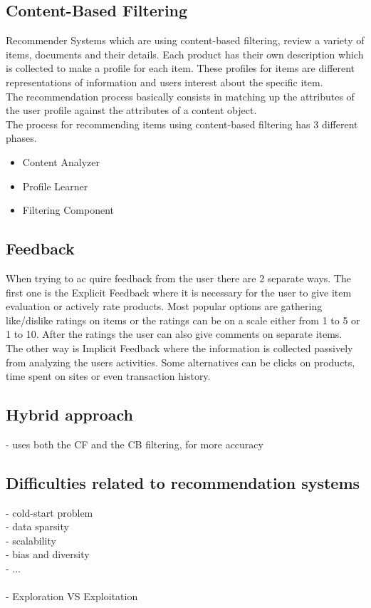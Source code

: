 \documentclass[10pt,oneside,english,a4paper]{article}
\begin{document}
\subsection{Content-Based Filtering}
Recommender Systems which are using content-based filtering, review a variety of items, documents and their details. Each product has their own description which is collected to make a profile for each item. These profiles for items are different representations of information and users interest about the specific item. \\
The recommendation process basically consists in matching
up the attributes of the user profile against the attributes of a content object.
\cite{pub.1034486657}\\
The process for recommending items using content-based filtering has 3 different phases.
\begin{itemize}
\item Content Analyzer
\item Profile Learner
\item Filtering Component
\end{itemize}

\subsection{Feedback}
When trying to ac	quire feedback from the user there are 2 separate ways. The first one is the Explicit Feedback where it is necessary for the user to give item evaluation or actively rate products. Most popular options are gathering like/dislike ratings on items or the ratings can be on a scale either from 1 to 5 or 1 to 10. After the ratings the user can also give comments on separate items. \\
The other way is Implicit Feedback where the information is collected passively from analyzing the users activities. Some alternatives can be clicks on products, time spent on sites or even transaction history.\\



\subsection{Hybrid approach}
- uses both the CF and the CB filtering, for more accuracy




\clearpage
\subsection{Difficulties related to recommendation systems}
- cold-start problem\\
- data sparsity\\
- scalability\\
- bias and diversity\\
- ...\\\\
- Exploration VS Exploitation\\\\
\end{document}
